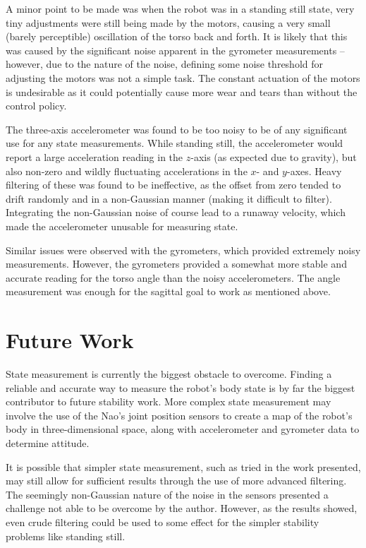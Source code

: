 A minor point to be made was when the robot was in a standing still state, very tiny adjustments were still being made by the motors, causing a very small (barely perceptible) oscillation of the torso back and forth. It is likely that this was caused by the significant noise apparent in the gyrometer measurements -- however, due to the nature of the noise, defining some noise threshold for adjusting the motors was not a simple task. The constant actuation of the motors is undesirable as it could potentially cause more wear and tears than without the control policy.

The three-axis accelerometer was found to be too noisy to be of any significant use for any state measurements. While standing still, the accelerometer would report a large acceleration reading in the $z$-axis (as expected due to gravity), but also non-zero and wildly fluctuating accelerations in the $x$- and $y$-axes. Heavy filtering of these was found to be ineffective, as the offset from zero tended to drift randomly and in a non-Gaussian manner (making it difficult to filter). Integrating the non-Gaussian noise of course lead to a runaway velocity, which made the accelerometer unusable for measuring state.

Similar issues were observed with the gyrometers, which provided extremely noisy measurements. However, the gyrometers provided a somewhat more stable and accurate reading for the torso angle than the noisy accelerometers. The angle measurement was enough for the sagittal goal to work as mentioned above.

\section{Future Work}

State measurement is currently the biggest obstacle to overcome. Finding a reliable and accurate way to measure the robot's body state is by far the biggest contributor to future stability work. More complex state measurement may involve the use of the Nao's joint position sensors to create a map of the robot's body in three-dimensional space, along with accelerometer and gyrometer data to determine attitude.

It is possible that simpler state measurement, such as tried in the work presented, may still allow for sufficient results through the use of more advanced filtering. The seemingly non-Gaussian nature of the noise in the sensors presented a challenge not able to be overcome by the author. However, as the results showed, even crude filtering could be used to some effect for the simpler stability problems like standing still.

